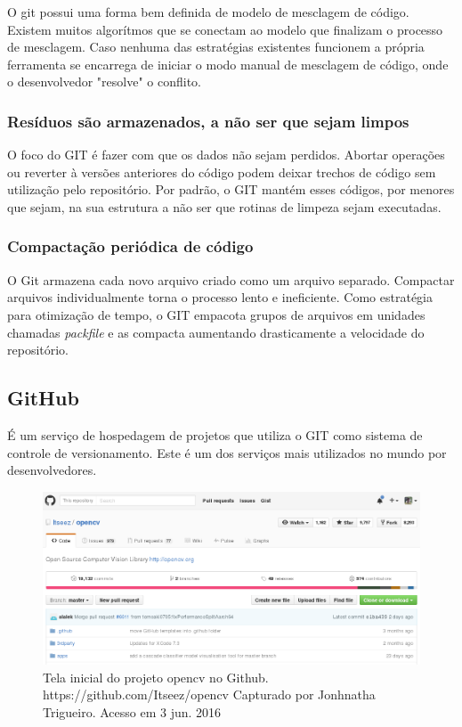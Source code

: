 \documentclass[
	article,			%
	12pt,				%
	oneside,			%
	a4paper,			%
	english,			
	brazil,
	sumario=tradicional
	]{abntex2}
\begin{document}
O git possui uma forma bem definida de modelo de mesclagem de código. Existem muitos algorítmos que se conectam ao modelo que finalizam o processo de mesclagem. Caso nenhuma das estratégias existentes funcionem a própria ferramenta se encarrega de iniciar o modo manual de mesclagem de código, onde o desenvolvedor "resolve" o conflito.

\subsubsection{Resíduos são armazenados, a não ser que sejam limpos}
O foco do GIT é fazer com que os dados não sejam perdidos. Abortar operações ou reverter à versões anteriores do código podem deixar trechos de código sem utilização pelo repositório. Por padrão, o GIT mantém esses códigos, por menores que sejam, na sua estrutura a não ser que rotinas de limpeza sejam executadas.

\subsubsection{Compactação periódica de código}
O Git armazena cada novo arquivo criado como um arquivo separado. Compactar arquivos individualmente torna o processo lento e ineficiente. Como estratégia para otimização de tempo, o GIT empacota grupos de arquivos em unidades chamadas \textit{packfile} e as compacta aumentando drasticamente a velocidade do repositório.


\subsection{GitHub}
É um serviço de hospedagem de projetos que utiliza o GIT como sistema de controle de versionamento. Este é um dos serviços mais utilizados no mundo por desenvolvedores.
\\
\begin{figure}[!h]
\centering
\includegraphics[scale=0.4]{images/github_main.png}
\caption{Tela inicial do projeto opencv no Github. https://github.com/Itseez/opencv Capturado por Jonhnatha Trigueiro. Acesso em 3 jun. 2016}
\label{github_main}
\end{figure}
\end{document}
